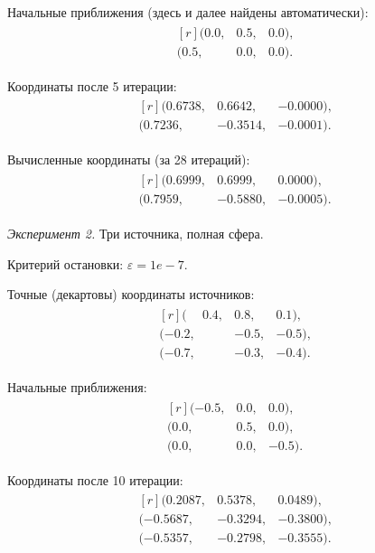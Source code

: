 Начальные приближения (здесь и далее найдены автоматически):
\begin{align*}
    \begin{matrix*}[r]
    (0.0, & 0.5, & 0.0) \text{,}\\
    (0.5, & 0.0, & 0.0) \text{.}
    \end{matrix*}
\end{align*}

Координаты после 5 итерации:
\begin{align*}
    \begin{matrix*}[r]
    (0.6738, & 0.6642, & -0.0000) \text{,}\\
    (0.7236, & -0.3514, & -0.0001) \text{.}
    \end{matrix*}
\end{align*}

Вычисленные координаты (за 28 итераций):
\begin{align*}
    \begin{matrix*}[r]
    (0.6999, & 0.6999, & 0.0000) \text{,}\\
    (0.7959, & -0.5880, & -0.0005) \text{.}
    \end{matrix*}
\end{align*}

\emph{Эксперимент 2.} Три источника, полная сфера.

Критерий остановки: $\varepsilon = 1e-7$.

Точные (декартовы) координаты источников:
\begin{align*}
    \begin{matrix*}[r]
    (\phantom{-}0.4, & 0.8, & 0.1) \text{,}\\
    (-0.2, & -0.5, & -0.5) \text{,}\\
    (-0.7, & -0.3, & -0.4) \text{.}
    \end{matrix*}
\end{align*}

Начальные приближения:
\begin{align*}\begin{matrix*}[r]
    (-0.5, & 0.0, & 0.0) \text{,}\\
    (0.0, & 0.5, & 0.0) \text{,}\\
    (0.0, & 0.0, & -0.5) \text{.}
\end{matrix*}\end{align*}

Координаты после 10 итерации:
\begin{align*}
    \begin{matrix*}[r]
    (0.2087, & 0.5378, & 0.0489) \text{,}\\
    (-0.5687, & -0.3294, & -0.3800) \text{,}\\
    (-0.5357, & -0.2798, & -0.3555) \text{.}
    \end{matrix*}
\end{align*}

